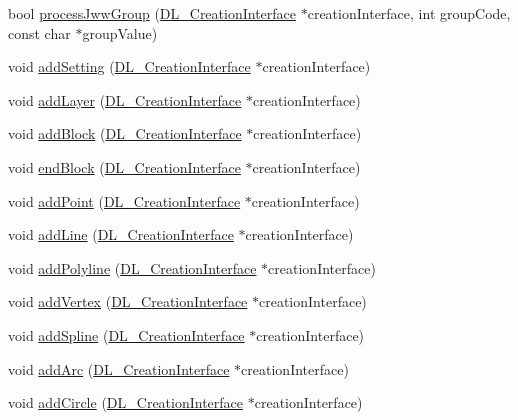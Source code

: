 \begin{DoxyCompactItemize}
\item 
bool \hyperlink{classDL__Jww_a8b43a0934fe87abd26f8836c29d1be07}{process\-Jww\-Group} (\hyperlink{classDL__CreationInterface}{D\-L\-\_\-\-Creation\-Interface} $\ast$creation\-Interface, int group\-Code, const char $\ast$group\-Value)
\item 
void \hyperlink{classDL__Jww_ab000bb3f54570a44fd01c9add1bd0726}{add\-Setting} (\hyperlink{classDL__CreationInterface}{D\-L\-\_\-\-Creation\-Interface} $\ast$creation\-Interface)
\item 
void \hyperlink{classDL__Jww_ad0b4ab866d5dd808d4f9f342396b8266}{add\-Layer} (\hyperlink{classDL__CreationInterface}{D\-L\-\_\-\-Creation\-Interface} $\ast$creation\-Interface)
\item 
void \hyperlink{classDL__Jww_aed69df968bcb9bf0bffd088e018da522}{add\-Block} (\hyperlink{classDL__CreationInterface}{D\-L\-\_\-\-Creation\-Interface} $\ast$creation\-Interface)
\item 
void \hyperlink{classDL__Jww_a1084339c6f7ba10405e1a60a768673fc}{end\-Block} (\hyperlink{classDL__CreationInterface}{D\-L\-\_\-\-Creation\-Interface} $\ast$creation\-Interface)
\item 
void \hyperlink{classDL__Jww_a062805465b6d38b19185e6370051e0bf}{add\-Point} (\hyperlink{classDL__CreationInterface}{D\-L\-\_\-\-Creation\-Interface} $\ast$creation\-Interface)
\item 
void \hyperlink{classDL__Jww_a290faf39f4ee51d3fb715560e1f22a4f}{add\-Line} (\hyperlink{classDL__CreationInterface}{D\-L\-\_\-\-Creation\-Interface} $\ast$creation\-Interface)
\item 
void \hyperlink{classDL__Jww_a4edf5d3635d7c803cdc3c452564ea3ed}{add\-Polyline} (\hyperlink{classDL__CreationInterface}{D\-L\-\_\-\-Creation\-Interface} $\ast$creation\-Interface)
\item 
void \hyperlink{classDL__Jww_a1d235c3ce741b812323635caf18bd310}{add\-Vertex} (\hyperlink{classDL__CreationInterface}{D\-L\-\_\-\-Creation\-Interface} $\ast$creation\-Interface)
\item 
void \hyperlink{classDL__Jww_a9df7f11c29f2dae33bbab5d109c887d4}{add\-Spline} (\hyperlink{classDL__CreationInterface}{D\-L\-\_\-\-Creation\-Interface} $\ast$creation\-Interface)
\item 
void \hyperlink{classDL__Jww_acc41f4c85577f14559f17211ac5a09cb}{add\-Arc} (\hyperlink{classDL__CreationInterface}{D\-L\-\_\-\-Creation\-Interface} $\ast$creation\-Interface)
\item 
void \hyperlink{classDL__Jww_a1b4a6deb83772971cc4a8403262b3cd7}{add\-Circle} (\hyperlink{classDL__CreationInterface}{D\-L\-\_\-\-Creation\-Interface} $\ast$creation\-Interface)

\end{DoxyCompactItemize}
